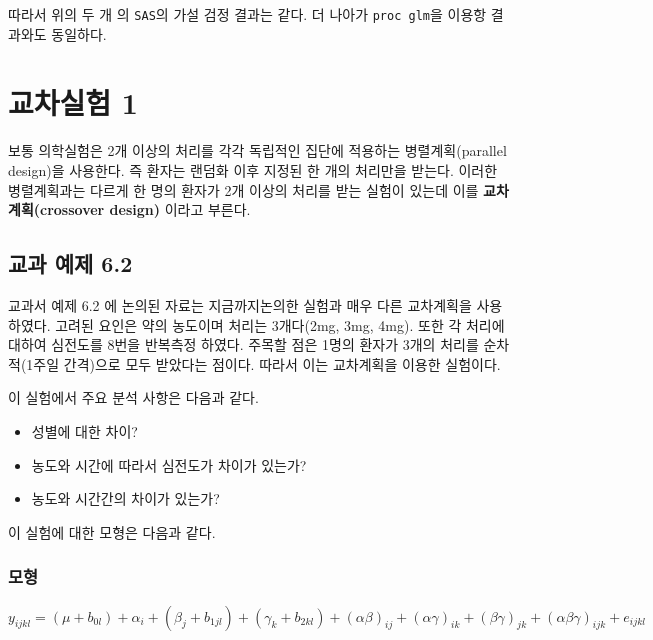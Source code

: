 \documentclass[
]{book}
\providecommand{\tightlist}{%
  \setlength{\itemsep}{0pt}\setlength{\parskip}{0pt}}
\theoremstyle{definition}
\theoremstyle{definition}
\theoremstyle{definition}
\theoremstyle{remark}
\begin{document}
따라서 위의 두 개 의 \texttt{SAS}의 가설 검정 결과는 같다. 더 나아가 \texttt{proc\ glm}을 이용항 결과와도 동일하다.

\hypertarget{crossover1}{%
\chapter{교차실험 1}\label{crossover1}}

보통 의학실험은 2개 이상의 처리를 각각 독립적인 집단에 적용하는 병렬계획(parallel design)을 사용한다. 즉 환자는 랜덤화 이후 지정된 한 개의 처리만을 받는다. 이러한 병렬계획과는 다르게 한 명의 환자가 2개 이상의 처리를 받는 실험이 있는데 이를 \textbf{교차계획(crossover design)} 이라고 부른다.

\hypertarget{uxad50uxacfc-uxc608uxc81c-6.2}{%
\section{교과 예제 6.2}\label{uxad50uxacfc-uxc608uxc81c-6.2}}

교과서 예제 6.2 에 논의된 자료는 지금까지논의한 실험과 매우 다른 교차계획을 사용하였다.
고려된 요인은 약의 농도이며 처리는 3개다(2mg, 3mg, 4mg). 또한 각 처리에 대하여 심전도를 8번을 반복측정 하였다.
주목할 점은 1명의 환자가 3개의 처리를 순차적(1주일 간격)으로 모두 받았다는 점이다. 따라서 이는 교차계획을 이용한 실험이다.

이 실험에서 주요 분석 사항은 다음과 같다.

\begin{itemize}
\tightlist
\item
  성별에 대한 차이?
\item
  농도와 시간에 따라서 심전도가 차이가 있는가?
\item
  농도와 시간간의 차이가 있는가?
\end{itemize}

이 실험에 대한 모형은 다음과 같다.

\hypertarget{uxbaa8uxd615-1}{%
\subsection{모형}\label{uxbaa8uxd615-1}}

\begin{equation}
y_{ijkl} = ( \mu + b_{0l} ) + \alpha_i + ( \beta_j + b_{1jl} ) + (\gamma_k  + b_{2kl})  + (\alpha \beta)_{ij} + 
(\alpha \gamma)_{ik} + (\beta \gamma)_{jk} + (\alpha \beta \gamma)_{ijk}  + e_{ijkl}
\label{eq:ex62model}
\end{equation}
\end{document}

